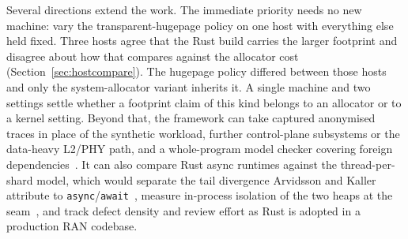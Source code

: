 \documentclass[english,oneside,a4paper,censored,csm,software-track-2020]{HYthesisML}
\begin{document}
Several directions extend the work. The immediate priority needs no new machine: vary the
transparent-hugepage policy on one host with everything else held fixed. Three hosts agree that
the Rust build carries the larger footprint and disagree about how that compares against the
allocator cost (Section~\ref{sec:hostcompare}). The hugepage policy differed between those hosts
and only the system-allocator variant inherits it. A single machine and two settings settle whether
a footprint claim of this kind belongs to an allocator or to a kernel setting. Beyond that, the
framework can take captured anonymised traces in place of the synthetic workload, further
control-plane subsystems or the data-heavy L2/PHY path, and a whole-program model checker
covering foreign dependencies~\cite{pearce2026rustmc}. It can also compare Rust async runtimes
against the thread-per-shard model, which would separate the tail divergence Arvidsson and Kaller
attribute to \texttt{async}/\texttt{await}~\cite{arvidsson2025async}, measure in-process isolation of
the two heaps at the seam~\cite{rivera2021galeed,kirth2022pkrusafe}, and track defect density
and review effort as Rust is adopted in a production RAN codebase.



\cleardoublepage %

\printbibliography
\end{document}
